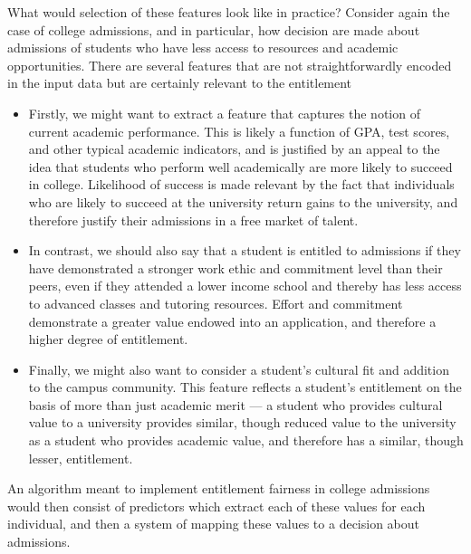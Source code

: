 What would selection of these features look like in practice? Consider again the case of
college admissions, and in particular, how decision are made about admissions of
students who have less access to resources and academic opportunities. There are
several features that are not straightforwardly encoded in the input data but
are certainly relevant to the entitlement
\begin{itemize}
    \item Firstly, we might want to extract a feature that captures the notion
    of current academic performance. This is likely a function of GPA, test
    scores, and other typical academic indicators, and is justified by an appeal
    to the idea that students who perform well academically are more likely to
    succeed in college. Likelihood of success is made relevant by the fact
    that individuals who are likely to succeed at the university return gains 
    to the university, and therefore justify their admissions in a free market
    of talent.
    \item In contrast, we should also say that a student is entitled to admissions if
    they have demonstrated a stronger work ethic and commitment level than their
    peers, even if they attended a lower income school and thereby has less 
    access to advanced classes and tutoring resources. Effort and commitment
    demonstrate a greater value endowed into an application, and therefore a
    higher degree of entitlement.
    \item Finally, we might also want to consider a student's cultural fit and
    addition to the campus community. This feature reflects a student's
    entitlement on the basis of more than just academic merit — a student who
    provides cultural value to a university provides similar, though reduced
    value to the university as a student who provides academic value, and
    therefore has a similar, though lesser, entitlement.
\end{itemize}
An algorithm meant to implement entitlement fairness in college admissions
would then consist of predictors which extract each of these values for each
individual, and then a system of mapping these values to a decision about
admissions. 

